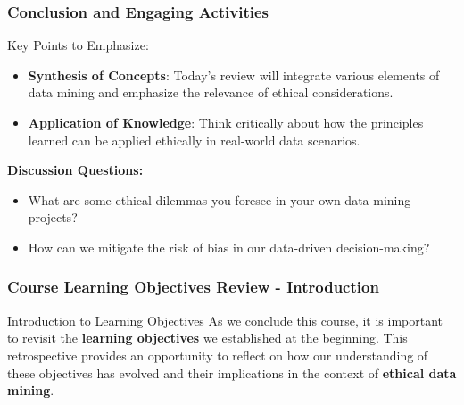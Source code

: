 \documentclass[aspectratio=169]{beamer}
\begin{document}
\begin{frame}[fragile]
    \frametitle{Conclusion and Engaging Activities}
    Key Points to Emphasize:
    \begin{itemize}
        \item \textbf{Synthesis of Concepts}: Today's review will integrate various elements of data mining and emphasize the relevance of ethical considerations.
        \item \textbf{Application of Knowledge}: Think critically about how the principles learned can be applied ethically in real-world data scenarios.
    \end{itemize}
    
    \textbf{Discussion Questions:}
    \begin{itemize}
        \item What are some ethical dilemmas you foresee in your own data mining projects?
        \item How can we mitigate the risk of bias in our data-driven decision-making?
    \end{itemize}
\end{frame}

\begin{frame}[fragile]
    \frametitle{Course Learning Objectives Review - Introduction}
    \begin{block}{Introduction to Learning Objectives}
        As we conclude this course, it is important to revisit the \textbf{learning objectives} we established at the beginning. This retrospective provides an opportunity to reflect on how our understanding of these objectives has evolved and their implications in the context of \textbf{ethical data mining}.
    \end{block}
\end{frame}
\end{document}
